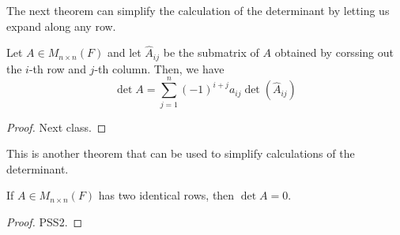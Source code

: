 \documentclass[main.tex]{subfiles}
\begin{document}
    The next theorem can simplify the calculation of the determinant by letting us expand along any row. 
    \begin{thrm}{}{}
        Let $A\in M_{n\times n}(F)$ and let $\hat{A}_{ij}$ be the submatrix of $A$ obtained by corssing out the $i$-th row and $j$-th column. Then, we have 
        \begin{equation*}
            \det A = \sum_{j=1}^{n} (-1)^{i+j} a_{ij} \det \left( \hat{A}_{ij} \right)
        \end{equation*}
    \end{thrm}
    \begin{proof}
        Next class.
    \end{proof}

    This is another theorem that can be used to simplify calculations of the determinant. 
    \begin{thrm}{}{}
        If $A\in M_{n\times n}(F)$ has two identical rows, then $\det A = 0$. 
    \end{thrm}
    \begin{proof}
            PSS2. 
    \end{proof}
\end{document}
